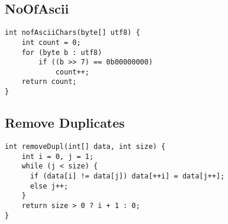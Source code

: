 \subsection*{NoOfAscii}
\begin{verbatim}
int nofAsciiChars(byte[] utf8) {
    int count = 0;
    for (byte b : utf8)
        if ((b >> 7) == 0b00000000)
            count++;
    return count;
}
\end{verbatim}
\subsection*{Remove Duplicates}
\begin{verbatim}
int removeDupl(int[] data, int size) {
    int i = 0, j = 1;
    while (j < size) {
      if (data[i] != data[j]) data[++i] = data[j++];
      else j++;
    }
    return size > 0 ? i + 1 : 0;
}
\end{verbatim}

